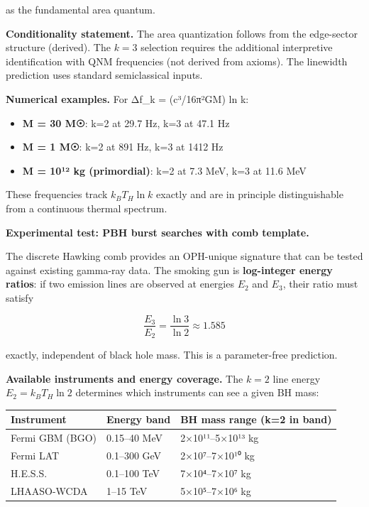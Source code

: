 \documentclass[
]{article}
\newcounter{none} %
\providecommand{\tightlist}{%
  \setlength{\itemsep}{0pt}\setlength{\parskip}{0pt}}
\begin{document}
as the fundamental area quantum.

\textbf{Conditionality statement.} The area quantization follows from
the edge-sector structure (derived). The \(k = 3\) selection requires
the additional interpretive identification with QNM frequencies (not
derived from axioms). The linewidth prediction uses standard
semiclassical inputs.

\textbf{Numerical examples.} For Δf\_k = (c³/16π²GM) ln k:

\begin{itemize}
\tightlist
\item
  \textbf{M = 30 M☉}: k=2 at 29.7 Hz, k=3 at 47.1 Hz
\item
  \textbf{M = 1 M☉}: k=2 at 891 Hz, k=3 at 1412 Hz
\item
  \textbf{M = 10¹² kg (primordial)}: k=2 at 7.3 MeV, k=3 at 11.6 MeV
\end{itemize}

These frequencies track \(k_B T_H \ln k\) exactly and are in principle
distinguishable from a continuous thermal spectrum.

\textbf{Experimental test: PBH burst searches with comb template.}

The discrete Hawking comb provides an OPH-unique signature that can be
tested against existing gamma-ray data. The smoking gun is
\textbf{log-integer energy ratios}: if two emission lines are observed
at energies \(E_2\) and \(E_3\), their ratio must satisfy

\[
\frac{E_3}{E_2} = \frac{\ln 3}{\ln 2} \approx 1.585
\]

exactly, independent of black hole mass. This is a parameter-free
prediction.

\textbf{Available instruments and energy coverage.} The \(k = 2\) line
energy \(E_2 = k_B T_H \ln 2\) determines which instruments can see a
given BH mass:

{\def\LTcaptype{none} %
\begin{longtable}[]{@{}lll@{}}
\toprule\noalign{}
Instrument & Energy band & BH mass range (k=2 in band) \\
\midrule\noalign{}
\endhead
\bottomrule\noalign{}
\endlastfoot
Fermi GBM (BGO) & 0.15--40 MeV & 2×10¹¹--5×10¹³ kg \\
Fermi LAT & 0.1--300 GeV & 2×10⁷--7×10¹⁰ kg \\
H.E.S.S. & 0.1--100 TeV & 7×10⁴--7×10⁷ kg \\
LHAASO-WCDA & 1--15 TeV & 5×10⁵--7×10⁶ kg \\
\end{longtable}
}
\end{document}
